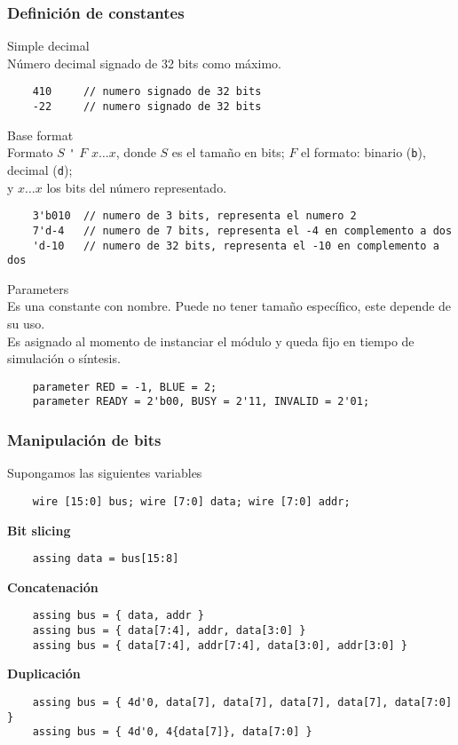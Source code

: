 \documentclass[aspectratio=169]{beamer}
\begin{document}
\begin{frame}[fragile]
    \frametitle{Definición de constantes}
    \normalsize \textcolor{naranjauca}{Simple decimal}\\ \small
    Número decimal signado de 32 bits como máximo.
\begin{lstlisting}
    410     // numero signado de 32 bits
    -22     // numero signado de 32 bits
\end{lstlisting}
    \pause
    \normalsize \textcolor{naranjauca}{Base format}\\ \small
    Formato \textcolor{azulC}{$S$} \verb|'| \textcolor{rojo}{$F$} \textcolor{amarillo}{$x \dots x$}, donde \textcolor{azulC}{$S$} es el tamaño en bits;
    \textcolor{rojo}{$F$} el formato: binario (\texttt{b}), decimal (\texttt{d});\\ %
    y \textcolor{amarillo}{$x \dots x$} los bits del número representado.
\begin{lstlisting}
    3'b010  // numero de 3 bits, representa el numero 2
    7'd-4   // numero de 7 bits, representa el -4 en complemento a dos
    'd-10   // numero de 32 bits, representa el -10 en complemento a dos
\end{lstlisting}
    \pause
    \normalsize \textcolor{naranjauca}{Parameters}\\ \small
    Es una constante con nombre. Puede no tener tamaño específico, este depende de su uso.\\
    Es asignado al momento de instanciar el módulo y queda fijo en tiempo de simulación o síntesis.
\begin{lstlisting}
    parameter RED = -1, BLUE = 2;
    parameter READY = 2'b00, BUSY = 2'11, INVALID = 2'01;
\end{lstlisting}
\end{frame}

\begin{frame}[fragile,t]
    \frametitle{Manipulación de bits}
    Supongamos las siguientes variables
\begin{lstlisting}
    wire [15:0] bus; wire [7:0] data; wire [7:0] addr;
\end{lstlisting}
    \bigskip
    \pause
    \textcolor{naranjauca}{\textbf{Bit slicing}}
\begin{lstlisting}
    assing data = bus[15:8]
\end{lstlisting}
    \pause
    \textcolor{naranjauca}{\textbf{Concatenación}}
\begin{lstlisting}
    assing bus = { data, addr }
    assing bus = { data[7:4], addr, data[3:0] }
    assing bus = { data[7:4], addr[7:4], data[3:0], addr[3:0] }
\end{lstlisting}
    \pause
    \textcolor{naranjauca}{\textbf{Duplicación}}
\begin{lstlisting}
    assing bus = { 4d'0, data[7], data[7], data[7], data[7], data[7:0] }
    assing bus = { 4d'0, 4{data[7]}, data[7:0] }
\end{lstlisting}
\end{frame}
\end{document}
